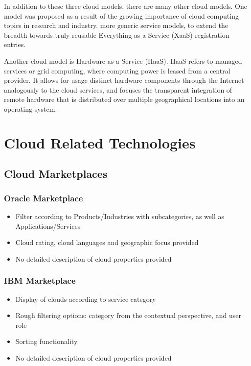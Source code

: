 		In addition to these three cloud models, there are many other cloud models. One model was proposed as a result of the growing importance of cloud computing topics in research and industry, more generic service models, to extend the breadth towards truly reusable Everything-as-a-Service (XaaS) registration entries.\cite{spillner_versatile_2013}
		\par Another cloud model is Hardware-as-a-Service (HaaS). HaaS refers to managed services or grid computing, where computing power is leased from a central provider\cite{what_is_haas}. It allows for usage distinct hardware components through the Internet analogously to the cloud services, and focuses the transparent integration of remote hardware that is distributed over multiple geographical locations into an operating system\cite{stanik_hardware_2012}.


\section {Cloud Related Technologies}
	\subsection {Cloud Marketplaces}
		\subsubsection {Oracle Marketplace}
			\begin{itemize}
				\item {Filter according to Products/Industries with subcategories, as well as Applications/Services}
				\item {Cloud rating, cloud languages and geographic focus provided}
				\item {No detailed description of cloud properties provided}
			\end{itemize}
		\subsubsection {IBM Marketplace}
			\begin{itemize}
				\item {Display of clouds according to service category}
				\item {Rough filtering options: category from the contextual perspective, and user role}
				\item {Sorting functionality}
				\item {No detailed description of cloud properties provided}
			\end{itemize}
